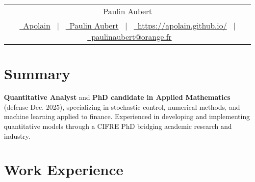 \documentclass[a4paper,12pt]{article}
\begin{document}
\pagestyle{empty} 

	\begin{tabularx}{\linewidth}{@{} C @{}}
	\Huge{Paulin Aubert} \\[7.5pt]
	\href{https://github.com/apolain/}{\raisebox{-0.05\height}\faGithub\ Apolain} \ $|$ \ 
	\href{https://www.linkedin.com/in/paulinaubert/}{\raisebox{-0.05\height}\faLinkedin\ Paulin Aubert} \ $|$ \ 
	\href{https://apolain.github.io/}{\raisebox{-0.05\height}\faGlobe \ https://apolain.github.io/} \ $|$ \ 
	\href{mailto:paulinaubert@orange.fr}{\raisebox{-0.05\height}\faEnvelope \ paulinaubert@orange.fr} \\
	\end{tabularx}

	\section{Summary}
	\textbf{Quantitative Analyst} and \textbf{PhD candidate in Applied Mathematics} (defense Dec. 2025), specializing in stochastic control, numerical methods, and machine learning applied to finance.
	Experienced in developing and implementing quantitative models through a CIFRE PhD bridging academic research and industry.
	
	\section{Work Experience}
\end{document}
